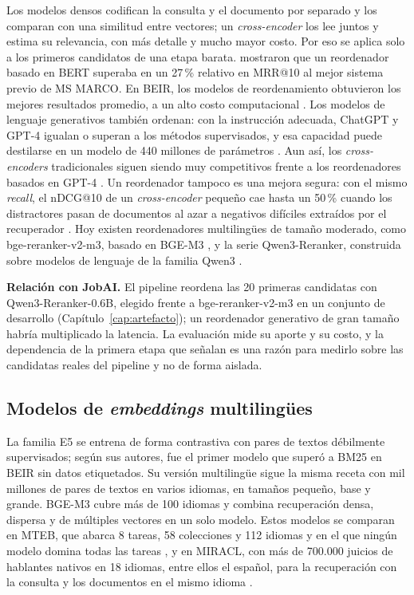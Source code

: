 Los modelos densos codifican la consulta y el documento por separado y los comparan con una similitud entre vectores; un \textit{cross-encoder} los lee juntos y estima su relevancia, con más detalle y mucho mayor costo. Por eso se aplica solo a los primeros candidatos de una etapa barata. \citet{Nogueira2019} mostraron que un reordenador basado en BERT superaba en un 27\,\% relativo en MRR@10 al mejor sistema previo de MS MARCO. En BEIR, los modelos de reordenamiento obtuvieron los mejores resultados promedio, a un alto costo computacional \citep{Thakur2021}. Los modelos de lenguaje generativos también ordenan: con la instrucción adecuada, ChatGPT y GPT-4 igualan o superan a los métodos supervisados, y esa capacidad puede destilarse en un modelo de 440 millones de parámetros \citep{Sun2023RankGPT}. Aun así, los \textit{cross-encoders} tradicionales siguen siendo muy competitivos frente a los reordenadores basados en GPT-4 \citep{Dejean2024}. Un reordenador tampoco es una mejora segura: con el mismo \textit{recall}, el nDCG@10 de un \textit{cross-encoder} pequeño cae hasta un 50\,\% cuando los distractores pasan de documentos al azar a negativos difíciles extraídos por el recuperador \citep{Lin2026Plug}. Hoy existen reordenadores multilingües de tamaño moderado, como bge-reranker-v2-m3, basado en BGE-M3 \citep{Chen2024M3}, y la serie Qwen3-Reranker, construida sobre modelos de lenguaje de la familia Qwen3 \citep{Zhang2025Qwen3}.

\textbf{Relación con JobAI.} El pipeline reordena las 20 primeras candidatas con Qwen3-Reranker-0.6B, elegido frente a bge-reranker-v2-m3 en un conjunto de desarrollo (Capítulo~\ref{cap:artefacto}); un reordenador generativo de gran tamaño habría multiplicado la latencia. La evaluación mide su aporte y su costo, y la dependencia de la primera etapa que señalan \citet{Lin2026Plug} es una razón para medirlo sobre las candidatas reales del pipeline y no de forma aislada.

\subsection{Modelos de \textit{embeddings} multilingües}

La familia E5 \citep{Wang2022E5} se entrena de forma contrastiva con pares de textos débilmente supervisados; según sus autores, fue el primer modelo que superó a BM25 en BEIR sin datos etiquetados. Su versión multilingüe \citep{Wang2024mE5} sigue la misma receta con mil millones de pares de textos en varios idiomas, en tamaños pequeño, base y grande. BGE-M3 \citep{Chen2024M3} cubre más de 100 idiomas y combina recuperación densa, dispersa y de múltiples vectores en un solo modelo. Estos modelos se comparan en MTEB, que abarca 8 tareas, 58 colecciones y 112 idiomas y en el que ningún modelo domina todas las tareas \citep{Muennighoff2023}, y en MIRACL, con más de 700.000 juicios de hablantes nativos en 18 idiomas, entre ellos el español, para la recuperación con la consulta y los documentos en el mismo idioma \citep{Zhang2023MIRACL}.

